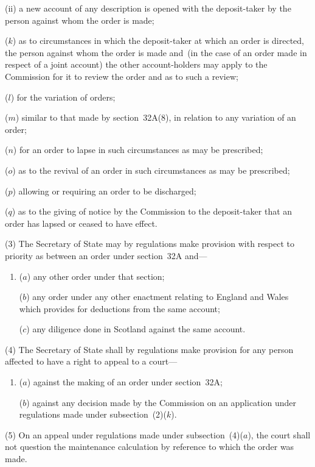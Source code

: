 \documentclass[12pt,a4paper]{article}
\begin{document}
\begin{enumerate}
\begin{enumerate}
(ii) a new account of any description is opened with the deposit-taker by
the person against whom the order is made;
\end{enumerate}

($k$) as to circumstances in which the deposit-taker at which an order is directed,
the person against whom the order is made and~(in the case of an order made
in respect of a joint account) the other account-holders may apply to the
Commission for it to review the order and as to
such a review;

($l$) for the variation of orders;

($m$) similar to that made by section~32A(8), in relation to any variation of an
order;

($n$) for an order to lapse in such circumstances as may be prescribed;

($o$) as to the revival of an order in such circumstances as may be prescribed;

($p$) allowing or requiring an order to be discharged;

($q$) as to the giving of notice by the Commission to the deposit-taker that an
order has lapsed or ceased to have effect.
\end{enumerate}

(3)
The Secretary of State may by regulations make provision with respect to priority as between an order under section~32A and---
\begin{enumerate}\item[]
($a$) any other order under that section;

($b$) any order under any other enactment relating to England and Wales which
provides for deductions from the same account;

($c$) any diligence done in Scotland against the same account.
\end{enumerate}

(4)
The Secretary of State shall by regulations make provision for any person affected to have a right to appeal to a court---
\begin{enumerate}\item[]
($a$) against the making of an order under section~32A;

($b$) against any decision made by the Commission on an application
under regulations made under subsection~(2)($k$).
\end{enumerate}

\begin{sloppypar}
(5)
On an appeal under regulations made under subsection~(4)($a$), the court shall not question the maintenance calculation by reference to which the order was made.
\end{sloppypar}
\end{document}
